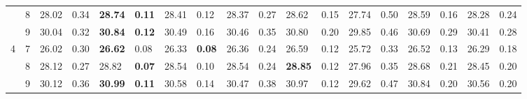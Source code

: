 \documentclass[conference]{IEEEtran}
\begin{document}
\begin{table}[t]
\begin{tabular}{|cc|ll|ll|ll|ll|ll|ll|ll|ll|}
		\multicolumn{1}{|c|}{}                    & 8          & \multicolumn{1}{l|}{28.02}         & 0.34                              & \multicolumn{1}{l|}{\textbf{28.74}} & \textbf{0.11}                     & \multicolumn{1}{l|}{28.41}         & 0.12                              & \multicolumn{1}{l|}{28.37}         & 0.27                              & \multicolumn{1}{l|}{28.62}                & 0.15          & \multicolumn{1}{l|}{27.74} & 0.50 & \multicolumn{1}{l|}{28.59}          & 0.16          & \multicolumn{1}{l|}{28.28} & 0.24 \\ \cline{2-18} 
		\multicolumn{1}{|c|}{}                    & 9          & \multicolumn{1}{l|}{30.04}         & 0.32                              & \multicolumn{1}{l|}{\textbf{30.84}} & \textbf{0.12}                     & \multicolumn{1}{l|}{30.49}         & 0.16                              & \multicolumn{1}{l|}{30.46}         & 0.35                              & \multicolumn{1}{l|}{30.80}                & 0.20          & \multicolumn{1}{l|}{29.85} & 0.46 & \multicolumn{1}{l|}{30.69}          & 0.29          & \multicolumn{1}{l|}{30.41} & 0.28 \\ \hline
		\multicolumn{1}{|c|}{\multirow{3}{*}{4}}  & 7          & \multicolumn{1}{l|}{26.02}         & 0.30                              & \multicolumn{1}{l|}{\textbf{26.62}} & 0.08                              & \multicolumn{1}{l|}{26.33}         & \textbf{0.08}                     & \multicolumn{1}{l|}{26.36}         & 0.24                              & \multicolumn{1}{l|}{26.59}                & 0.12          & \multicolumn{1}{l|}{25.72} & 0.33 & \multicolumn{1}{l|}{26.52}          & 0.13          & \multicolumn{1}{l|}{26.29} & 0.18 \\ \cline{2-18} 
		\multicolumn{1}{|c|}{}                    & 8          & \multicolumn{1}{l|}{28.12}         & 0.27                              & \multicolumn{1}{l|}{28.82}          & \textbf{0.07}                     & \multicolumn{1}{l|}{28.54}         & 0.10                              & \multicolumn{1}{l|}{28.54}         & 0.24                              & \multicolumn{1}{l|}{\textbf{28.85}}       & 0.12          & \multicolumn{1}{l|}{27.96} & 0.35 & \multicolumn{1}{l|}{28.68}          & 0.21          & \multicolumn{1}{l|}{28.45} & 0.20 \\ \cline{2-18} 
		\multicolumn{1}{|c|}{}                    & 9          & \multicolumn{1}{l|}{30.12}         & 0.36                              & \multicolumn{1}{l|}{\textbf{30.99}} & \textbf{0.11}                     & \multicolumn{1}{l|}{30.58}         & 0.14                              & \multicolumn{1}{l|}{30.47}         & 0.38                              & \multicolumn{1}{l|}{30.97}                & 0.12          & \multicolumn{1}{l|}{29.62} & 0.47 & \multicolumn{1}{l|}{30.84}          & 0.20          & \multicolumn{1}{l|}{30.56} & 0.20 \\ \hline

\end{tabular}
\end{table}
\end{document}
